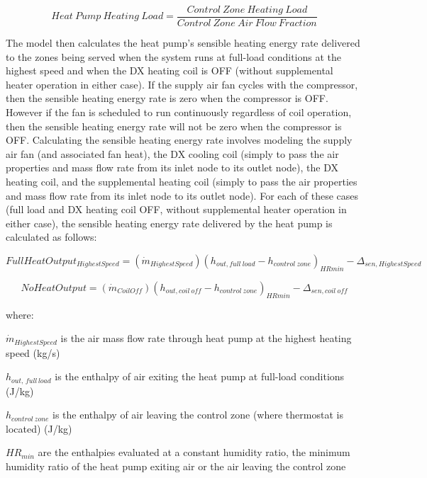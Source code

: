 \begin{equation}
Heat~Pump~Heating~Load = \frac{{Control~Zone~Heating~Load}}{{Control~Zone~Air~Flow~Fraction}}
\end{equation}

The model then calculates the heat pump's sensible heating energy rate delivered to the zones being served when the system runs at full-load conditions at the highest speed and when the DX heating coil is OFF (without supplemental heater operation in either case). If the supply air fan cycles with the compressor, then the sensible heating energy rate is zero when the compressor is OFF. However if the fan is scheduled to run continuously regardless of coil operation, then the sensible heating energy rate will not be zero when the compressor is OFF. Calculating the sensible heating energy rate involves modeling the supply air fan (and associated fan heat), the DX cooling coil (simply to pass the air properties and mass flow rate from its inlet node to its outlet node), the DX heating coil, and the supplemental heating coil (simply to pass the air properties and mass flow rate from its inlet node to its outlet node). For each of these cases (full load and DX heating coil OFF, without supplemental heater operation in either case), the sensible heating energy rate delivered by the heat pump is calculated as follows:

\begin{equation}
FullHeatOutpu{t_{HighestSpeed}} = \left( {{{\dot m}_{HighestSpeed}}} \right){\left( {{h_{out,full~load}} - {h_{control~zone}}} \right)_{HRmin}} - {\Delta_{sen,HighestSpeed}}
\end{equation}

\begin{equation}
NoHeatOutput = \left( {{{\dot m}_{CoilOff}}} \right){\left( {{h_{out,coil~off}} - {h_{control~zone}}} \right)_{HRmin}} - {\Delta_{sen,coil~off}}
\end{equation}

where:

\({\dot m}_{HighestSpeed}\) is the air mass flow rate through heat pump at the highest heating speed (kg/s)

\(h_{out,\, full\, load}\) is the enthalpy of air exiting the heat pump at full-load conditions (J/kg)

\(h_{control~zone}\) is the enthalpy of air leaving the control zone (where thermostat is located) (J/kg)

\(HR_{min}\) are the enthalpies evaluated at a constant humidity ratio, the minimum humidity ratio of the heat pump exiting air or the air leaving the control zone

